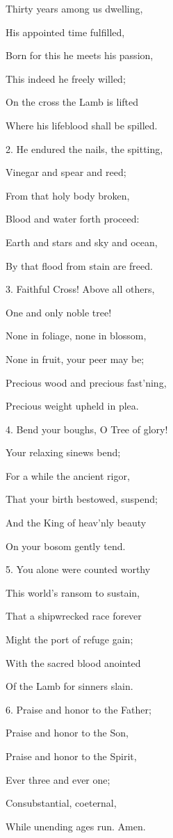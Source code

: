 Thirty years among us dwelling,

\noindent His appointed time fulfilled,

\noindent Born for this he meets his passion,

\noindent This indeed he freely willed;

\noindent On the cross the Lamb is lifted

\noindent Where his lifeblood shall be spilled.

\noindent 

2. He endured the nails, the spitting,

\noindent Vinegar and spear and reed;

\noindent From that holy body broken,

\noindent Blood and water forth proceed:

\noindent Earth and stars and sky and ocean,

\noindent By that flood from stain are freed.

\noindent 

3. Faithful Cross! Above all others,

\noindent One and only noble tree!

\noindent None in foliage, none in blossom,

\noindent None in fruit, your peer may be;

\noindent Precious wood and precious fast'ning,

\noindent Precious weight upheld in plea.

\noindent 

4. Bend your boughs, O Tree of glory!

\noindent Your relaxing sinews bend;

\noindent For a while the ancient rigor,

\noindent That your birth bestowed, suspend;

\noindent And the King of heav'nly beauty

\noindent On your bosom gently tend.

\noindent 

5. You alone were counted worthy

\noindent This world's ransom to sustain,

\noindent That a shipwrecked race forever

\noindent Might the port of refuge gain;

\noindent With the sacred blood anointed

\noindent Of the Lamb for sinners slain.

\noindent 

6. Praise and honor to the Father;

\noindent Praise and honor to the Son,

\noindent Praise and honor to the Spirit,

\noindent Ever three and ever one;

\noindent Consubstantial, coeternal,

\noindent While unending ages run. Amen.
